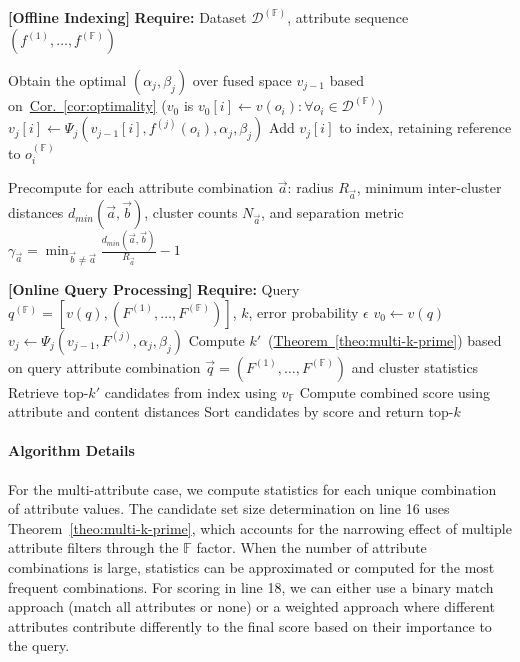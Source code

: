 \documentclass[numbers,sort]{article}
\begin{document}
\begin{algorithm}[H]
\small
\caption{Hierarchical Multi-Attribute Vector Indexing}
\begin{algorithmic}[1]
\STATE \textbf{[Offline Indexing]} \textbf{Require:} Dataset $\mathcal{D}^{(\mathbb{F})}$, attribute sequence $(f^{(1)},\ldots,f^{(\mathbb{F})})$

\STATE Obtain the optimal ${(\alpha_j, \beta_j)}$ over fused space $v_{j-1}$ based on~\hyperref[cor:optimality]{Cor.~\ref*{cor:optimality}} ($v_0$ is $v_0[i] \gets v(o_i):\forall o_i \in \mathcal{D}^{(\mathbb{F})}$)
\STATE $v_j[i] \gets \Psi_j(v_{j-1}[i], f^{(j)}(o_i), \alpha_j, \beta_j)$
\STATE Add $v_j[i]$ to index, retaining reference to $o_i^{(\mathbb{F})}$
\ENDFOR
\ENDFOR

\STATE Precompute for each attribute combination $\vec{a}$: radius $R_{\vec{a}}$, minimum inter-cluster distances $d_{min}(\vec{a},\vec{b})$, cluster counts $N_{\vec{a}}$, and separation metric $\gamma_{\vec{a}} = \min_{\vec{b} \neq \vec{a}} \frac{d_{min}(\vec{a},\vec{b})}{R_{\vec{a}}} - 1$

\STATE \textbf{[Online Query Processing]} \textbf{Require:} Query $q^{(\mathbb{F})} = [v(q), (F^{(1)},\ldots,F^{(\mathbb{F})})]$, $k$, error probability $\epsilon$
\STATE $v_0 \gets v(q)$
\STATE $v_j \gets \Psi_j(v_{j-1}, F^{(j)}, \alpha_j, \beta_j)$
\ENDFOR
\STATE Compute $k'$~(\hyperref[theo:multi-k-prime]{Theorem~\ref*{theo:multi-k-prime}}) based on query attribute combination $\vec{q} = (F^{(1)},\ldots,F^{(\mathbb{F})})$ and cluster statistics
\STATE Retrieve top-$k'$ candidates from index using $v_{\mathbb{F}}$
\STATE Compute combined score using attribute and content distances
\ENDFOR
\STATE Sort candidates by score and return top-$k$
\end{algorithmic}
\label{alg:hierarchical}
\end{algorithm}

\paragraph{Algorithm Details} For the multi-attribute case, we compute statistics for each unique combination of attribute values. The candidate set size determination on line 16 uses Theorem~\ref{theo:multi-k-prime}, which accounts for the narrowing effect of multiple attribute filters through the $\mathbb{F}$ factor. When the number of attribute combinations is large, statistics can be approximated or computed for the most frequent combinations. For scoring in line 18, we can either use a binary match approach (match all attributes or none) or a weighted approach where different attributes contribute differently to the final score based on their importance to the query.
\end{document}
